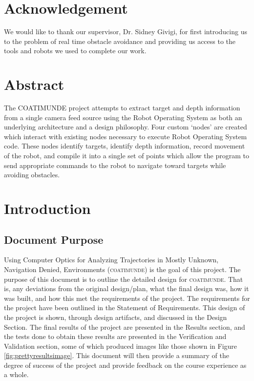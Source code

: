 \documentclass{article}[12]
\begin{document}

\section*{Acknowledgement}

We would like to thank our supervisor, Dr. Sidney Givigi, for first introducing us to the problem of real time obstacle avoidance and providing us access to the tools and robots we used to complete our work.

\section*{Abstract}

The COATIMUNDE project attempts to extract target and depth information from a single camera feed source using the Robot Operating System as both an underlying architecture and a design philosophy. Four custom `nodes' are created which interact with existing nodes necessary to execute Robot Operating System code. These nodes identify targets, identify depth information, record movement of the robot, and compile it into a single set of points which allow the program to send appropriate commands to the robot to navigate toward targets while avoiding obstacles.
	
\tableofcontents \newpage



\section{Introduction}

	\subsection{Document Purpose}
	
	Using Computer Optics for Analyzing Trajectories in Mostly Unknown, Navigation Denied, Environments (\textsc{coatimunde}) is the goal of this project. The purpose of this document is to outline the detailed design for \textsc{coatimunde}. That is, any deviations from the original design/plan, what the final design was, how it was built, and how this met the requirements of the project.  The requirements for the project have been outlined in the Statement of Requirements. This design of the project is shown, through design artifacts, and discussed in the Design Section. The final results of the project are presented in the Results section, and the tests done to obtain these results are presented in the Verification and Validation section, some of which produced images like those shown in Figure \ref{fig:prettyresultsimage}. This document will then provide a summary of the degree of success of the project and provide feedback on the course experience as a whole.
	
\end{document}
